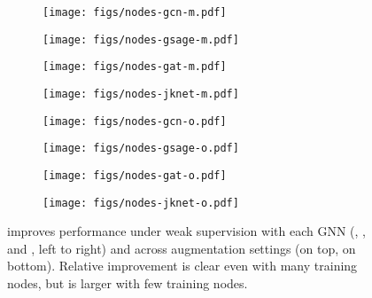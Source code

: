 \documentclass[letterpaper]{article} \usepackage{aaai21}  \usepackage{times}  \usepackage{helvet} \usepackage{courier}  \usepackage[hyphens]{url}  \usepackage{graphicx} \urlstyle{rm} \def\UrlFont{\rm}  \usepackage{natbib}  \usepackage{caption} \frenchspacing  \setlength{\pdfpagewidth}{8.5in}  \setlength{\pdfpageheight}{11in}
\begin{document}
\begin{figure*}[t!]
    \centering
        \begin{subfigure}[b]{.23\linewidth}
          \texttt{[image: figs/nodes-gcn-m.pdf]}
            \label{fig:}
        \end{subfigure}
        \begin{subfigure}[b]{.23\linewidth}
          \texttt{[image: figs/nodes-gsage-m.pdf]}
            \label{fig:}
        \end{subfigure}
        \begin{subfigure}[b]{.23\linewidth}
            \texttt{[image: figs/nodes-gat-m.pdf]}
            \label{fig:}
        \end{subfigure}
        \begin{subfigure}[b]{.23\linewidth}
            \texttt{[image: figs/nodes-jknet-m.pdf]}
            \label{fig:}
        \end{subfigure}
        \begin{subfigure}[b]{.23\linewidth}
          \texttt{[image: figs/nodes-gcn-o.pdf]}
            \label{fig:}
        \end{subfigure}
        \begin{subfigure}[b]{.23\linewidth}
          \texttt{[image: figs/nodes-gsage-o.pdf]}
            \label{fig:}
        \end{subfigure}
        \begin{subfigure}[b]{.23\linewidth}
            \texttt{[image: figs/nodes-gat-o.pdf]}
            \label{fig:}
        \end{subfigure}
        \begin{subfigure}[b]{.23\linewidth}
            \texttt{[image: figs/nodes-jknet-o.pdf]}
            \label{fig:}
        \end{subfigure}
\caption{\methodshared improves performance under weak supervision with each GNN (\gcn, \gsage, \gat and \jknet, left to right) and across augmentation settings (\methodtwo on top, \method on bottom).  Relative improvement is clear even with many training nodes, but is larger with few training nodes.}\label{fig:super_full}
\end{figure*}
\end{document}
